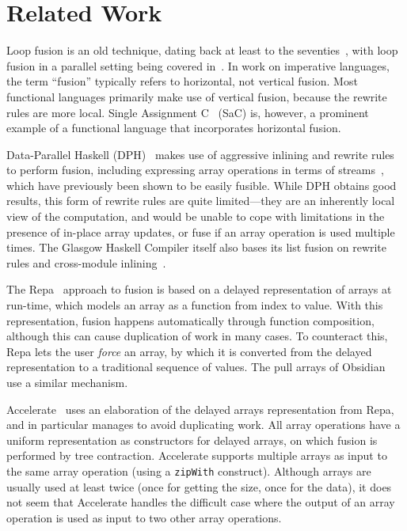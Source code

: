 \section{Related Work}
\label{sec:related-work-fusion}

Loop fusion is an old technique, dating back at least to the
seventies~\cite{cheatham1977programming}, with loop fusion in a
parallel setting being covered in~\cite{midki1990issues}. In work on
imperative languages, the term ``fusion'' typically refers to
horizontal, not vertical fusion.  Most functional languages primarily
make use of vertical fusion, because the rewrite rules are more local.
Single Assignment C~\cite{grelck2006sac} (SaC) is, however, a
prominent example of a functional language that incorporates
horizontal fusion.

Data-Parallel Haskell (DPH)~\cite{Chak06DPH} makes use of aggressive
inlining and rewrite rules to perform fusion, including expressing
array operations in terms of streams~\cite{coutts2007rewriting}, which
have previously been shown to be easily fusible.  While DPH obtains
good results, this form of rewrite rules are quite limited---they are
an inherently local view of the computation, and would be unable to
cope with limitations in the presence of in-place array updates, or
fuse if an array operation is used multiple times.  The Glasgow
Haskell Compiler itself also bases its list fusion on rewrite rules
and cross-module inlining~\cite{jones2001playing}.

The Repa~\cite{keller2010regular} approach to fusion is based on a
delayed representation of arrays at run-time, which models an array as
a function from index to value.  With this representation, fusion
happens automatically through function composition, although this can
cause duplication of work in many cases.  To counteract this, Repa
lets the user \textit{force} an array, by which it is converted from
the delayed representation to a traditional sequence of values.  The
pull arrays of Obsidian~\cite{claessen2012expressive} use a similar
mechanism.

Accelerate~\cite{mcdonell2013optimising} uses an elaboration of the
delayed arrays representation from Repa, and in particular manages to
avoid duplicating work.  All array operations have a uniform
representation as constructors for delayed arrays, on which fusion is
performed by tree contraction.  Accelerate supports multiple arrays as
input to the same array operation (using a \texttt{zipWith}
construct).  Although arrays are usually used at least twice (once for
getting the size, once for the data), it does not seem that Accelerate
handles the difficult case where the output of an array operation is
used as input to two other array operations.

